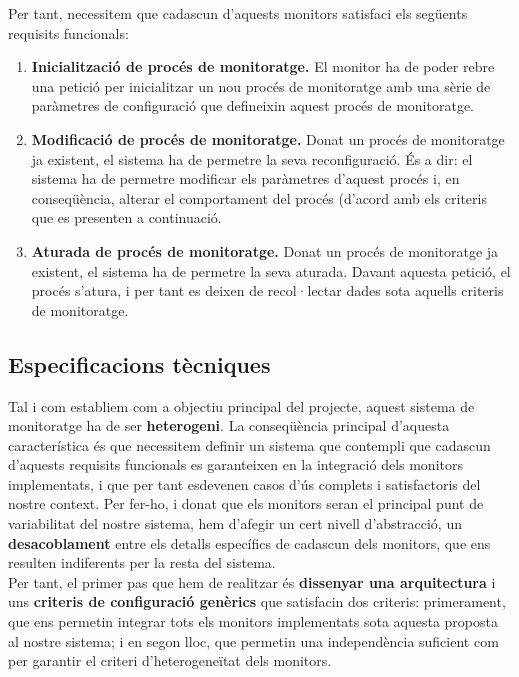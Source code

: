 Per tant, necessitem que cadascun d'aquests monitors satisfaci els següents requisits funcionals:

\begin{enumerate}
\item \textbf{Inicialització de procés de monitoratge.} El monitor ha de poder rebre una petició per inicialitzar un nou procés de monitoratge amb una sèrie de paràmetres de configuració que defineixin aquest procés de monitoratge.
\item \textbf{Modificació de procés de monitoratge.} Donat un procés de monitoratge ja existent, el sistema ha de permetre la seva reconfiguració. És a dir: el sistema ha de permetre modificar els paràmetres d'aquest procés i, en conseqüència, alterar el comportament del procés (d'acord amb els criteris que es presenten a continuació.
\item \textbf{Aturada de procés de monitoratge.} Donat un procés de monitoratge ja existent, el sistema ha de permetre la seva aturada. Davant aquesta petició, el procés s'atura, i per tant es deixen de recol·lectar dades sota aquells criteris de monitoratge.
\end{enumerate}

\subsection{Especificacions tècniques}

Tal i com establiem com a objectiu principal del projecte, aquest sistema de monitoratge ha de ser \textbf{heterogeni}. La conseqüència principal d'aquesta característica és que necessitem definir un sistema que contempli que cadascun d'aquests requisits funcionals es garanteixen en la integració dels monitors implementats, i que per tant esdevenen casos d'ús complets i satisfactoris del nostre context. Per fer-ho, i donat que els monitors seran el principal punt de variabilitat del nostre sistema, hem d'afegir un cert nivell d'abstracció, un \textbf{desacoblament} entre els detalls específics de cadascun dels monitors, que ens resulten indiferents per la resta del sistema.\\

Per tant, el primer pas que hem de realitzar és \textbf{dissenyar una arquitectura} i uns \textbf{criteris de configuració genèrics} que satisfacin dos criteris: primerament, que ens permetin integrar tots els monitors implementats sota aquesta proposta al nostre sistema; i en segon lloc, que permetin una independència suficient com per garantir el criteri d'heterogeneïtat dels monitors.\\

